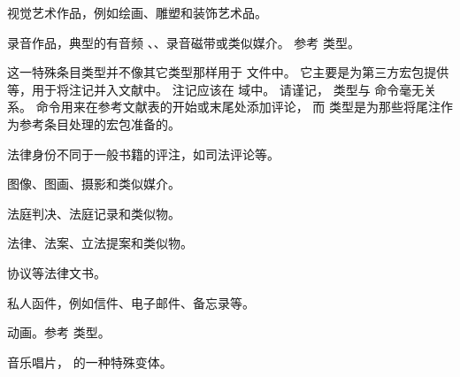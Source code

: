 \begin{typelist}

视觉艺术作品，例如绘画、雕塑和装饰艺术品。

录音作品，典型的有音频 、、录音磁带或类似媒介。
参考  类型。

这一特殊条目类型并不像其它类型那样用于  文件中。
它主要是为第三方宏包提供  等，用于将注记并入文献中。
注记应该在  域中。
请谨记， 类型与  命令毫无关系。
 命令用来在参考文献表的开始或末尾处添加评论，
而  类型是为那些将尾注作为参考条目处理的宏包准备的。

法律身份不同于一般书籍的评注，如司法评论等。

图像、图画、摄影和类似媒介。

法庭判决、法庭记录和类似物。

法律、法案、立法提案和类似物。

协议等法律文书。

私人函件，例如信件、电子邮件、备忘录等。

动画。参考  类型。

音乐唱片， 的一种特殊变体。


\end{typelist}
